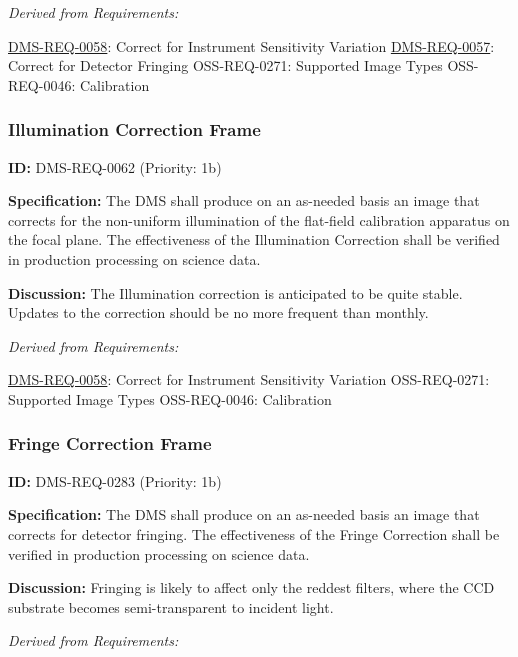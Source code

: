 \documentclass[SE,toc,lsstdraft]{lsstdoc}
\begin{document}
\emph{Derived from Requirements:}

\hyperref[DMS-REQ-0058]{DMS-REQ-0058}:
Correct for Instrument Sensitivity Variation \newline
\hyperref[DMS-REQ-0057]{DMS-REQ-0057}:
Correct for Detector Fringing \newline
OSS-REQ-0271:
Supported Image Types \newline
OSS-REQ-0046:
Calibration \newline

\subsubsection{Illumination Correction Frame}

\label{DMS-REQ-0062}
\textbf{ID:} DMS-REQ-0062 (Priority: 1b)

\textbf{Specification:} The DMS shall produce on an as-needed basis an image that corrects for the non-uniform illumination of the flat-field calibration apparatus on the focal plane. The effectiveness of the Illumination Correction shall be verified in production processing on science data.

\textbf{Discussion:} The Illumination correction is anticipated to be quite stable. Updates to the correction should be no more frequent than monthly.

\emph{Derived from Requirements:}

\hyperref[DMS-REQ-0058]{DMS-REQ-0058}:
Correct for Instrument Sensitivity Variation \newline
OSS-REQ-0271:
Supported Image Types \newline
OSS-REQ-0046:
Calibration \newline

\subsubsection{Fringe Correction Frame}

\label{DMS-REQ-0283}
\textbf{ID:} DMS-REQ-0283 (Priority: 1b)

\textbf{Specification:} The DMS shall produce on an as-needed basis an image that corrects for detector fringing. The effectiveness of the Fringe Correction shall be verified in production processing on science data.

\textbf{Discussion: }Fringing is likely to affect only the reddest filters, where the CCD substrate becomes semi-transparent to incident light.

\emph{Derived from Requirements:}
\end{document}
